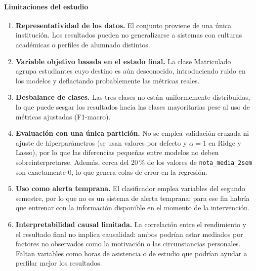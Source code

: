 \documentclass[11pt,letterpaper]{article}
\newcommand{\code}[1]{\texttt{#1}}
\begin{document}
\paragraph{Limitaciones del estudio}
\begin{enumerate}
\item \textbf{Representatividad de los datos.} El conjunto proviene de una única institución. Los resultados pueden no generalizarse a sistemas con culturas académicas o perfiles de alumnado distintos.
\item \textbf{Variable objetivo basada en el estado final.} La clase Matriculado agrupa estudiantes cuyo destino es aún desconocido, introduciendo ruido en los modelos y deflactando probablemente las métricas reales.
\item \textbf{Desbalance de clases.} Las tres clases no están uniformemente distribuidas, lo que puede sesgar los resultados hacia las clases mayoritarias pese al uso de métricas ajustadas (F1-macro).
\item \textbf{Evaluación con una única partición.} No se emplea validación cruzada ni ajuste de hiperparámetros (se usan valores por defecto y $\alpha=1$ en Ridge y Lasso), por lo que las diferencias pequeñas entre modelos no deben sobreinterpretarse. Además, cerca del 20\,\% de los valores de \code{nota\_media\_2sem} son exactamente 0, lo que genera colas de error en la regresión.
\item \textbf{Uso como alerta temprana.} El clasificador emplea variables del segundo semestre, por lo que no es un sistema de alerta temprana; para ese fin habría que entrenar con la información disponible en el momento de la intervención.
\item \textbf{Interpretabilidad causal limitada.} La correlación entre el rendimiento y el resultado final no implica causalidad: ambos podrían estar mediados por factores no observados como la motivación o las circunstancias personales. Faltan variables como horas de asistencia o de estudio que podrían ayudar a perfilar mejor los resultados.
\end{enumerate}
\end{document}

